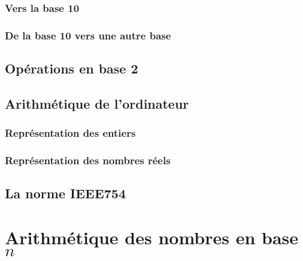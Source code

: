 \documentclass[
  letterpaper,
]{scrbook}
\theoremstyle{definition}
\theoremstyle{definition}
\theoremstyle{remark}
\begin{document}
\hypertarget{vers-la-base-10}{%
\subsection{Vers la base 10}\label{vers-la-base-10}}

\hypertarget{de-la-base-10-vers-une-autre-base}{%
\subsection{De la base 10 vers une autre
base}\label{de-la-base-10-vers-une-autre-base}}

\hypertarget{opuxe9rations-en-base-2}{%
\section{Opérations en base 2}\label{opuxe9rations-en-base-2}}

\hypertarget{arithmuxe9tique-de-lordinateur}{%
\section{Arithmétique de
l'ordinateur}\label{arithmuxe9tique-de-lordinateur}}

\hypertarget{repruxe9sentation-des-entiers}{%
\subsection{Représentation des
entiers}\label{repruxe9sentation-des-entiers}}

\hypertarget{repruxe9sentation-des-nombres-ruxe9els}{%
\subsection{Représentation des nombres
réels}\label{repruxe9sentation-des-nombres-ruxe9els}}

\hypertarget{la-norme-ieee754}{%
\section{La norme IEEE754}\label{la-norme-ieee754}}


\hypertarget{arithmuxe9tique-des-nombres-en-base-n}{%
\chapter{\texorpdfstring{Arithmétique des nombres en base
\(n\)}{Arithmétique des nombres en base n}}\label{arithmuxe9tique-des-nombres-en-base-n}}
\end{document}
